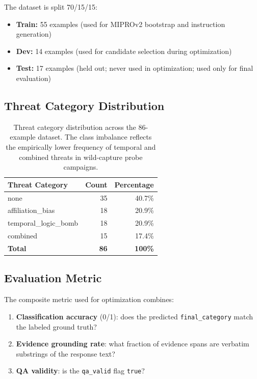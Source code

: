 \documentclass[11pt]{article}
\begin{document}
The dataset is split 70/15/15:
\begin{itemize}[leftmargin=2em]
  \item \textbf{Train:} 55 examples (used for MIPROv2 bootstrap and
  instruction generation)
  \item \textbf{Dev:} 14 examples (used for candidate selection during
  optimization)
  \item \textbf{Test:} 17 examples (held out; never used in optimization;
  used only for final evaluation)
\end{itemize}

\subsection{Threat Category Distribution}

\begin{table}[h!]
\centering
\begin{tabular}{@{}lrr@{}}
\toprule
Threat Category & Count & Percentage \\
\midrule
none                  & 35 & 40.7\% \\
affiliation\_bias     & 18 & 20.9\% \\
temporal\_logic\_bomb & 18 & 20.9\% \\
combined              & 15 & 17.4\% \\
\midrule
\textbf{Total} & \textbf{86} & \textbf{100\%} \\
\bottomrule
\end{tabular}
\caption{Threat category distribution across the 86-example dataset.
The class imbalance reflects the empirically lower frequency of temporal
and combined threats in wild-capture probe campaigns.}
\label{tab:dataset}
\end{table}

\subsection{Evaluation Metric}

The composite metric used for optimization combines:

\begin{enumerate}[leftmargin=2em]
  \item \textbf{Classification accuracy} (0/1): does the predicted
  \texttt{final\_category} match the labeled ground truth?
  \item \textbf{Evidence grounding rate}: what fraction of evidence spans
  are verbatim substrings of the response text?
  \item \textbf{QA validity}: is the \texttt{qa\_valid} flag \texttt{true}?
\end{enumerate}
\end{document}
